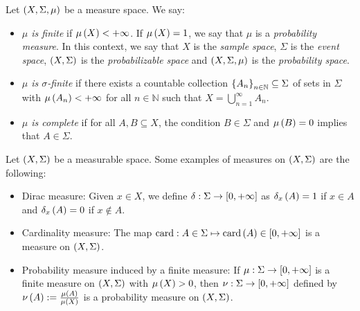 \begin{definition}
  Let $\left(X,\Sigma,\mu\right)$ be a measure space. We say:

  \begin{itemize}
    \item \emph{$\mu$ is finite} if $\mu\left(X\right)<+\infty$. If $\mu\left(X\right)=1$, we say that $\mu$ is a \emph{probability measure}. In this context, we say that $X$ is the \emph{sample space}, $\Sigma$ is the \emph{event space}, $\left(X,\Sigma\right)$ is the \emph{probabilizable space} and $\left(X,\Sigma,\mu\right)$ is the \emph{probability space}. 
    \item \emph{$\mu$ is $\sigma$-finite} if there exists a countable collection $\left\{A_n\right\}_{n\in\mathbb{N}}\subseteq\Sigma$ of sets in $\Sigma$ with $\mu\left(A_n\right)<+\infty$ for all $n\in\mathbb{N}$ such that $X=\bigcup_{n=1}^{\infty}{A_n}$.
    \item \emph{$\mu$ is complete} if for all $A,B\subseteq X$, the condition $B\in\Sigma$ and $\mu\left(B\right)=0$ implies that $A\in\Sigma$.
  \end{itemize}
\end{definition}

\begin{example}
  Let $\left(X,\Sigma\right)$ be a measurable space. Some examples of measures on $\left(X,\Sigma\right)$ are the following:

  \begin{itemize}
    \item Dirac measure: Given $x\in X$, we define $\delta:\Sigma\rightarrow\left[0,+\infty\right]$ as $\delta_x\left(A\right)=1$ if $x\in A$ and $\delta_x\left(A\right)=0$ if $x\notin A$.
    \item Cardinality measure: The map $\text{card}:A\in\Sigma\mapsto\text{card}\left(A\right)\in\left[0,+\infty\right]$ is a measure on $\left(X,\Sigma\right)$.
    \item Probability measure induced by a finite measure: If $\mu:\Sigma\rightarrow\left[0,+\infty\right]$ is a finite measure on $\left(X,\Sigma\right)$ with $\mu\left(X\right)>0$, then $\nu:\Sigma\rightarrow\left[0,+\infty\right]$ defined by $\nu\left(A\right):=\frac{\mu\left(A\right)}{\mu\left(X\right)}$ is a probability measure on $\left(X,\Sigma\right)$.
  \end{itemize}
\end{example}


